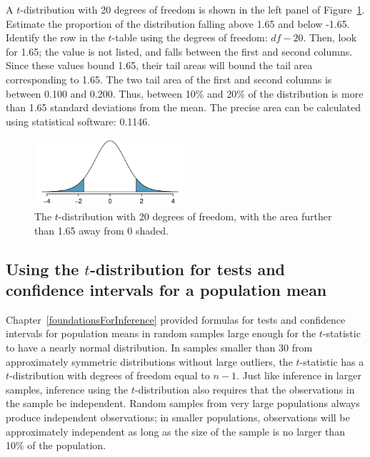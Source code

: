 \begin{example}{A $t$-distribution with 20 degrees of freedom is shown in the left panel of Figure~\ref{tDistDF20RightTail1Point65}. Estimate the proportion of the distribution falling above 1.65 and below -1.65.}
Identify the row in the $t$-table using the degrees of freedom: $df-20$. Then, look for 1.65; the value is not listed, and falls between the first and second columns. Since these values bound 1.65, their tail areas will bound the tail area corresponding to 1.65. The two tail area of the first and second columns is between 0.100 and 0.200. Thus, between 10\% and 20\% of the distribution is more than 1.65 standard deviations from the mean. The precise area can be calculated using statistical software: 0.1146.

\begin{figure}
	\centering
	\includegraphics[width=0.5\textwidth]{ch_inference_for_means_oi_biostat/figures/tDistDF20RightTail1Point65/tDistDF20RightTail1Point65}
	\caption{The $t$-distribution with 20 degrees of freedom, with the area further than 1.65 away from 0 shaded.}
	\label{tDistDF20RightTail1Point65}
\end{figure}

\end{example}


\subsection{Using the $t$-distribution for tests and confidence intervals for a population mean}

\label{oneSampleTConfidenceIntervalsTests}


Chapter~\ref{foundationsForInference} provided formulas for tests and confidence intervals for population means in random samples large enough for the $t$-statistic to have a nearly normal distribution.  In samples smaller than 30 from approximately symmetric distributions without large outliers, the $t$-statistic has a $t$-distribution with degrees of freedom equal to $n - 1$. Just like inference in larger samples, inference using the $t$-distribution also requires that the observations in the sample be independent.  Random samples from very large populations always produce independent observations;  in smaller populations, observations will be approximately independent as long as the size of the sample is no larger than 10\% of the population.

